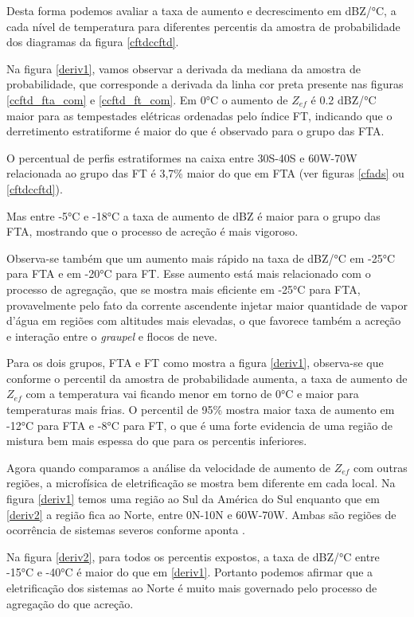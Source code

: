 Desta forma podemos avaliar a taxa de aumento e decrescimento em dBZ/°C, a cada nível de temperatura para diferentes percentis da amostra de probabilidade dos diagramas da figura \ref{cftdccftd}.

Na figura \ref{deriv1}, vamos observar a derivada da mediana da amostra de probabilidade, que corresponde a derivada da linha cor preta presente nas figuras \ref{ccftd_fta_com} e \ref{ccftd_ft_com}. Em 0°C o aumento de $Z_{ef}$ é 0.2 dBZ/°C maior para as tempestades elétricas ordenadas pelo índice FT, indicando que o derretimento estratiforme é maior do que é observado para o grupo das FTA.

O percentual de perfis estratiformes na caixa entre  30S-40S e 60W-70W relacionada ao grupo das FT é 3,7\% maior do que em FTA (ver figuras \ref{cfads} ou \ref{cftdccftd}).  

Mas entre -5°C e -18°C a taxa de aumento de dBZ é maior para o grupo das FTA, mostrando que o processo de acreção é mais vigoroso. 

Observa-se também que um aumento mais rápido na taxa de dBZ/°C em -25°C para FTA e em -20°C para FT. Esse aumento está mais relacionado com o processo de agregação, que se mostra mais eficiente em -25°C para FTA, provavelmente pelo fato da corrente ascendente injetar maior quantidade de vapor d'água em regiões com altitudes mais elevadas, o que favorece também a acreção e interação entre o \textit{graupel} e flocos de neve. 

Para os dois grupos, FTA e FT como mostra a figura \ref{deriv1}, observa-se que conforme o percentil da amostra de probabilidade aumenta, a taxa de aumento de $Z_{ef}$ com a temperatura vai ficando menor em torno de 0°C e maior para temperaturas mais frias. O percentil de 95\% mostra maior taxa de aumento em -12°C para FTA e -8°C para FT, o que é uma forte evidencia de uma região de mistura bem mais espessa do que para os percentis inferiores. 

Agora quando comparamos a análise da velocidade de aumento de $Z_{ef}$ com outras regiões, a microfísica de eletrificação se mostra bem diferente em cada local. Na figura \ref{deriv1} temos uma região ao Sul da América do Sul enquanto que em \ref{deriv2} a região fica ao Norte, entre 0N-10N e 60W-70W. Ambas são regiões de ocorrência de sistemas severos conforme aponta \cite{cecil2005}.	 

Na figura \ref{deriv2}, para todos os percentis expostos, a taxa de dBZ/°C entre -15°C e -40°C é maior do que em \ref{deriv1}. Portanto podemos afirmar que a eletrificação dos sistemas ao Norte é muito mais governado pelo processo de agregação do que acreção. 

